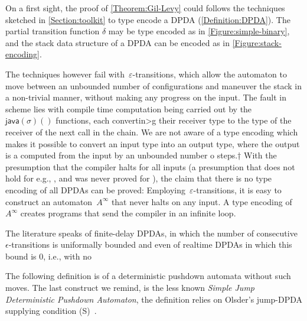 On a first sight, the proof of \cref{Theorem:Gil-Levy} could follows the techniques
  sketched in \cref{Section:toolkit} to type encode a DPDA (\cref{Definition:DPDA}).
The partial transition function $\delta$ may be type encoded as in \cref{Figure:simple-binary}, 
and the stack data structure of a DPDA can be encoded as in \cref{Figure:stack-encoding}. 

The techniques however fail with~$ε$-transitions, 
  which allow the automaton to move between an unbounded number of
  configurations and maneuver the stack in a non-trivial manner,
  without making any progress on the input.
The fault in scheme lies with  compile time computation being carried out
  by the~$\textsf{java}(σ)()$ functions, each convertin>g
  their receiver type to the type of the receiver of the next call in the chain.
We are not aware of a \Java type encoding which makes
  it possible to convert an input type into an output type, where
  the output is a computed from the input by an unbounded number o steps.†{%
    With the presumption that the \Java compiler halts for all inputs (a presumption that does
    not hold for e.g., \CC, and was never proved for \Java), the claim that there is no \Java type encoding of all DPDAs can be proved:
 Employing~$ε$-transitions, it is easy to construct an automaton~$A^∞$ that
  never halts on any input.
A type encoding of~$A^∞$ creates programs that send the compiler in an infinite loop.
}

The literature speaks of finite-delay DPDAs, in which the number 
  of consecutive $\epsilon$-transitions is uniformally bounded and even of 
  realtime DPDAs in which this bound is 0, i.e., with no  

The following definition is of a deterministic pushdown automata without such moves.
The last construct we remind, is the less known \emph{Simple Jump Deterministic Pushdown Automaton},
the definition relies on Olsder's jump-DPDA supplying condition (S)~\cite{Courcelle:77}.

